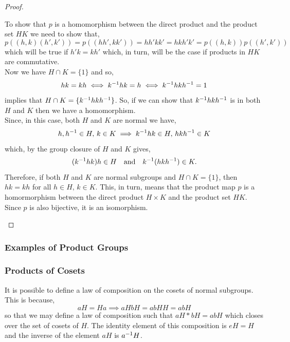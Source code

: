 \documentclass[MathsNotesBase.tex]{subfiles}
\begin{document}
{\begin{proof}
\begin{enumerate}[label=(\roman*)]
{					To show that $p$ is a homomorphism between the direct product and the product set $HK$ we need to show that,
					\[ p((h,k)(h',k')) = p((hh', kk')) = hh'kk' = hkh'k' = p((h,k))p((h',k')) \]
					which will be true if ${ h'k = kh' }$ which, in turn, will be the case if products in $HK$ are commutative.\\
					Now we have ${ H \cap K = \{1\} }$ and so,
					\[ hk = kh \iff {k}^{-1}hk = h \iff {k}^{-1}hk{h}^{-1} = 1 \]
					implies that ${ H \cap K = \{{k}^{-1}hk{h}^{-1}\} }$. So, if we can show that ${ {k}^{-1}hk{h}^{-1} }$ is in both $H$ and $K$ then we have a homomorphism.\\
					Since, in this case, both $H$ and $K$ are normal we have,
					\[ h,{h}^{-1} \in H,\, k \in K \implies {k}^{-1}hk \in H,\, hk{h}^{-1} \in K \]
					which, by the group closure of $H$ and $K$ gives,
					\[ ({k}^{-1}hk)h \in H \hspace{10pt}\text{and}\hspace{10pt} {k}^{-1}(hk{h}^{-1}) \in K. \]
					Therefore, if both $H$ and $K$ are normal subgroups and ${ H \cap K = \{1\} }$, then ${ hk = kh }$ for all ${ h \in H,\, k \in K }$. This, in turn, means that the product map $p$ is a homormorphism between the direct product ${ H \times K }$ and the product set $HK$. Since $p$ is also bijective, it is an isomorphism. 
				}
			\end{enumerate}
		\end{proof}
	
		\subsubsection{Examples of Product Groups}
		\begin{exe}
		\end{exe}
	
		\bigskip
		\subsubsection{Products of Cosets}
		It is possible to define a law of composition on the cosets of normal subgroups. This is because,
		\[ aH = Ha \implies aHbH = abHH = abH \]
		so that we may define a law of composition such that ${ aH * bH = abH }$ which closes over the set of cosets of $H$. The identity element of this composition is ${ eH = H }$ and the inverse of the element $aH$ is ${ {a}^{-1}H }$.
		
}
\end{document}
